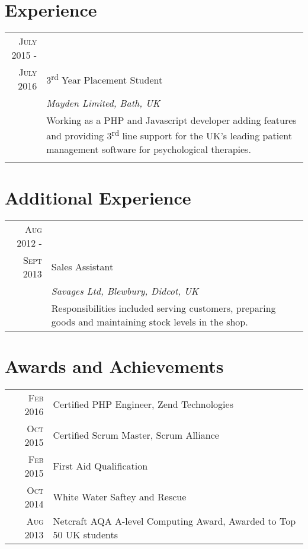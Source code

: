 \documentclass[a4paper,12pt]{article}
\begin{document}
{\vspace{1cm}
\section{Experience}
\begin{tabular}{rp{11cm}}
\textsc{July} 2015 -\\ \textsc{July} 2016 & 3\textsuperscript{rd} Year Placement Student \\&\emph{Mayden Limited, Bath, UK}\\&\footnotesize{Working as a PHP and Javascript developer adding features and providing 3\textsuperscript{rd} line support for the UK's leading patient management software for psychological therapies.}\\\multicolumn{2}{c}{} \\
\end{tabular}

\vspace{1cm}
\section{Additional Experience}
\begin{tabular}{rp{11cm}}
\textsc{Aug} 2012 -\\ \textsc{Sept} 2013 & Sales Assistant\\&\emph{Savages Ltd, Blewbury, Didcot, UK}\\&\footnotesize{Responsibilities included serving customers, preparing goods and maintaining stock levels in the shop.  }\\
\end{tabular}
\vspace{1cm}

\section{Awards and Achievements}
\begin{tabular}{rl}
 \textsc{Feb} 2016 & Certified PHP Engineer, Zend Technologies\\
 \textsc{Oct} 2015 & Certified Scrum Master, Scrum Alliance\\
 \textsc{Feb} 2015 & First Aid Qualification\\
 \textsc{Oct} 2014 & White Water Saftey and Rescue\\
 \textsc{Aug} 2013 & Netcraft AQA A-level Computing Award, Awarded to Top 50 UK students\\
\end{tabular}

}
\end{document}
